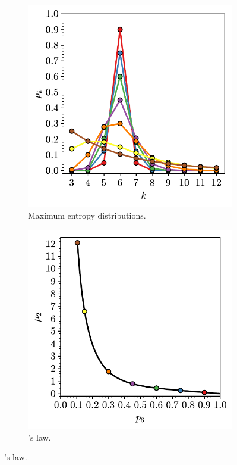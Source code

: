 \begin{figure}[h]
     \centering
     
     \begin{subfigure}[b]{0.45\textwidth}
         \centering
         \includegraphics[width=\textwidth]{./figures/methods/lm_1.pdf}
         \caption{Maximum entropy distributions.}
         \label{fig:lm1}
     \end{subfigure}
     \hfill
      \begin{subfigure}[b]{0.45\textwidth}
         \centering
         \includegraphics[width=\textwidth]{./figures/methods/lm_2.pdf}
         \caption{\lm's law.}
         \label{fig:lm2}
     \end{subfigure}
     \hfill
     

\end{figure}
